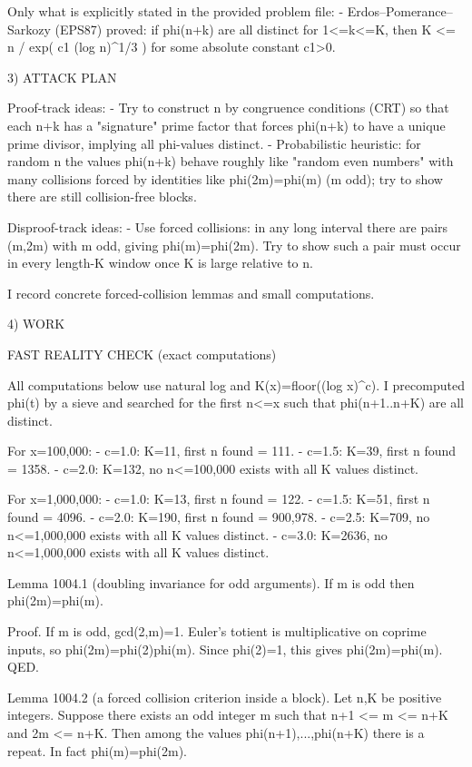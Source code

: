 Only what is explicitly stated in the provided problem file:
- Erdos--Pomerance--Sarkozy (EPS87) proved: if phi(n+k) are all distinct for 1<=k<=K, then
    K <= n / exp( c1 (log n)^{1/3} )
  for some absolute constant c1>0.

3) ATTACK PLAN

Proof-track ideas:
- Try to construct n by congruence conditions (CRT) so that each n+k has a "signature" prime factor that forces phi(n+k) to have a unique prime divisor, implying all phi-values distinct.
- Probabilistic heuristic: for random n the values phi(n+k) behave roughly like "random even numbers" with many collisions forced by identities like phi(2m)=phi(m) (m odd); try to show there are still collision-free blocks.

Disproof-track ideas:
- Use forced collisions: in any long interval there are pairs (m,2m) with m odd, giving phi(m)=phi(2m). Try to show such a pair must occur in every length-K window once K is large relative to n.

I record concrete forced-collision lemmas and small computations.

4) WORK

FAST REALITY CHECK (exact computations)

All computations below use natural log and K(x)=floor((log x)^c).
I precomputed phi(t) by a sieve and searched for the first n<=x such that phi(n+1..n+K) are all distinct.

For x=100,000:
- c=1.0: K=11, first n found = 111.
- c=1.5: K=39, first n found = 1358.
- c=2.0: K=132, no n<=100,000 exists with all K values distinct.

For x=1,000,000:
- c=1.0: K=13, first n found = 122.
- c=1.5: K=51, first n found = 4096.
- c=2.0: K=190, first n found = 900,978.
- c=2.5: K=709, no n<=1,000,000 exists with all K values distinct.
- c=3.0: K=2636, no n<=1,000,000 exists with all K values distinct.

Lemma 1004.1 (doubling invariance for odd arguments).
If m is odd then phi(2m)=phi(m).

Proof.
If m is odd, gcd(2,m)=1. Euler's totient is multiplicative on coprime inputs, so
  phi(2m)=phi(2)phi(m).
Since phi(2)=1, this gives phi(2m)=phi(m).  QED.

Lemma 1004.2 (a forced collision criterion inside a block).
Let n,K be positive integers. Suppose there exists an odd integer m such that
  n+1 <= m <= n+K  and  2m <= n+K.
Then among the values phi(n+1),...,phi(n+K) there is a repeat.
In fact phi(m)=phi(2m).

